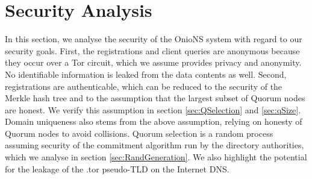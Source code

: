 \documentclass[USenglish,oneside,twocolumn]{article}
\begin{document}
%
%
%
%

\section{Security Analysis}
\label{sec:Analysis}

In this section, we analyse the security of the OnioNS system with regard to our security goals. First, the registrations and client queries are anonymous because they occur over a Tor circuit, which we assume provides privacy and anonymity. No identifiable information is leaked from the data contents as well. Second, registrations are authenticable, which can be reduced to the security of the Merkle hash tree and to the assumption that the largest subset of Quorum nodes are honest. We verify this assumption in section \ref{sec:QSelection} and \ref{sec:qSize}. Domain uniqueness also stems from the above assumption, relying on honesty of Quorum nodes to avoid collisions. Quorum selection is a random process assuming security of the commitment algorithm run by the directory authorities, which we analyse in section \ref{sec:RandGeneration}. We also highlight the potential for the leakage of the .tor pseudo-TLD on the Internet DNS.
\end{document}
